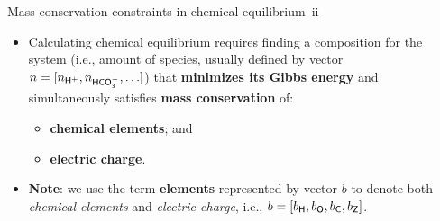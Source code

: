\begin{frame}[<+->]{Mass conservation constraints in chemical equilibrium\, ii}

	\begin{itemize}
		\item Calculating chemical equilibrium requires finding a composition for
		the system (i.e., amount of species, usually defined by vector 
		$n = [n_{\sf H^{+}}, n_{\sf HCO_{3}^{-}}, \ldots]$) that 
		\textbf{minimizes its Gibbs energy} and simultaneously satisfies 
		\alert{\textbf{mass conservation}} of:
		\begin{itemize}
			\item \textbf{chemical elements}; and
			\item \textbf{electric charge}.
		\end{itemize}
		\item \alert{\textbf{Note}}: we use the term \alert{\textbf{elements}} represented by vector $b$ 
		to denote both \emph{chemical elements} and \emph{electric charge}, i.e., 
		$b = [b_{\sf H}, b_{\sf O}, b_{\sf C}, b_{\sf Z}]$.
	\end{itemize}
\end{frame}
%
%
